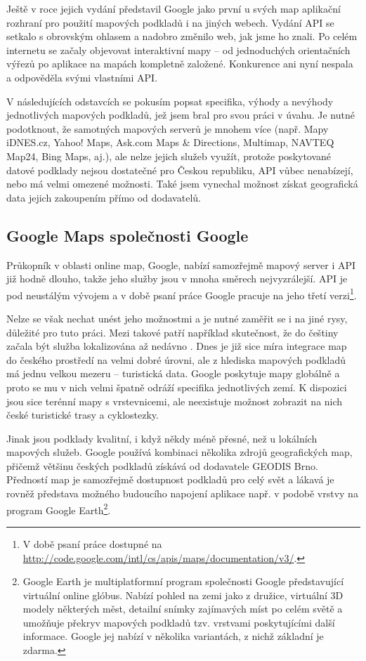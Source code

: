 Ještě v roce jejich vydání představil Google jako první u svých
map aplikační rozhraní pro použití mapových podkladů i na jiných
webech. Vydání API se setkalo s obrovským ohlasem \cite{gmapsSuccess}
a nadobro změnilo web, jak jsme ho znali. Po celém internetu se začaly objevovat
interaktivní mapy -- od jednoduchých orientačních výřezů po aplikace
na mapách kompletně založené. Konkurence ani nyní nespala a odpověděla
svými vlastními API.

V následujících odstavcích se pokusím popsat specifika, výhody a
nevýhody jednotlivých mapových podkladů, jež jsem bral pro svou práci
v úvahu. Je nutné podotknout, že samotných mapových serverů je mnohem
více (např. Mapy iDNES.cz, Yahoo! Maps, Ask.com Maps \& Directions,
Multimap, NAVTEQ Map24, Bing Maps, aj.), ale nelze jejich služeb využít,
protože poskytované datové podklady nejsou dostatečné pro Českou
republiku, API vůbec nenabízejí, nebo má velmi omezené možnosti. Také
jsem vynechal možnost získat geografická data jejich zakoupením přímo od dodavatelů.

\subsection{Google Maps společnosti Google}
Průkopník v oblasti online map, Google, nabízí samozřejmě mapový
server i API již hodně dlouho, takže jeho služby jsou v mnoha směrech
nejvyzrálejší. API je pod neustálým vývojem a v době psaní práce
Google pracuje na jeho třetí
verzi\footnote{V době psaní práce dostupné na
\url{http://code.google.com/intl/cs/apis/maps/documentation/v3/}.}.

Nelze se však nechat unést jeho možnostmi a je nutné zaměřit se i na
jiné rysy, důležité pro tuto práci. Mezi takové patří
například skutečnost, že do češtiny začala být služba lokalizována až
nedávno \cite{googleCesky}.
Dnes je již sice míra integrace map do českého prostředí na velmi
dobré úrovni, ale z hlediska mapových podkladů má jednu velkou mezeru
-- turistická data. Google poskytuje mapy globálně a proto se mu v
nich velmi špatně odráží specifika jednotlivých zemí. K dispozici
jsou sice terénní mapy s vrstevnicemi, ale neexistuje možnost
zobrazit na nich české turistické trasy a cyklostezky.

Jinak jsou podklady kvalitní, i když někdy méně přesné, než u
lokálních mapových služeb. Google používá kombinaci několika zdrojů
geografických map, přičemž většinu českých podkladů získává od
dodavatele GEODIS Brno. Předností map je samozřejmě dostupnost
podkladů pro celý svět a lákavá je rovněž představa možného budoucího 
napojení aplikace např. v podobě vrstvy na program Google
Earth\footnote{Google Earth je multiplatformní program společnosti
Google představující virtuální online glóbus. Nabízí pohled na zemi
jako z družice, virtuální 3D modely některých měst, detailní snímky
zajímavých míst po celém světě a umožňuje překryv mapových podkladů
tzv. vrstvami poskytujícími další informace. Google jej nabízí v
několika variantách, z nichž základní je zdarma.}.

